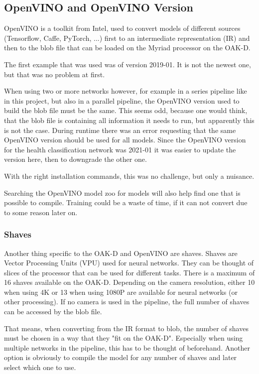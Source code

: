 \documentclass[a4paper,titlepage]{article}
\begin{document}
\subsection{OpenVINO and OpenVINO Version}

OpenVINO is a toolkit from Intel, used to convert models of different sources (Tensorflow, Caffe, PyTorch, ...) first to an intermediate representation (IR) and then to the blob file that can be loaded on the Myriad processor on the OAK-D.

The first example that was used was of version 2019-01.
It is not the newest one, but that was no problem at first.

When using two or more networks however, for example in a series pipeline like in this project, but also in a parallel pipeline, the OpenVINO version used to build the blob file must be the same.
This seems odd, because one would think, that the blob file is containing all information it needs to run, but apparently this is not the case.
During runtime there was an error requesting that the same OpenVINO version should be used for all models.
Since the OpenVINO version for the health classification network was 2021-01 it was easier to update the version here, then to downgrade the other one.

With the right installation commands, this was no challenge, but only a nuisance.

Searching the OpenVINO model zoo for models will also help find one that is possible to compile.
Training could be a waste of time, if it can not convert due to some reason later on.

\subsubsection{Shaves}

Another thing specific to the OAK-D and OpenVINO are shaves.
Shaves are Vector Processing Units (VPU) used for neural networks.
They can be thought of slices of the processor that can be used for different tasks.
There is a maximum of 16 shaves available on the OAK-D.
Depending on the camera resolution, either 10 when using 4K or 13 when using 1080P are available for neural networks (or other processing).
If no camera is used in the pipeline, the full number of shaves can be accessed by the blob file.

That means, when converting from the IR format to blob, the number of shaves must be chosen in a way that they "fit on the OAK-D".
Especially when using multiple networks in the pipeline, this has to be thought of beforehand.
Another option is obviously to compile the model for any number of shaves and later select which one to use.
\end{document}
